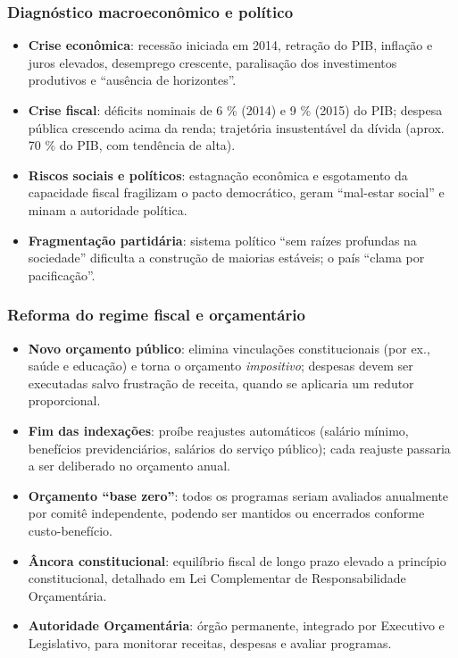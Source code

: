 \documentclass[a4paper,12pt]{article}[abntex2]
\begin{document}
\subsubsection{\textbf{Diagnóstico macroeconômico e político}}
\begin{itemize}
    \item \textbf{Crise econômica}: recessão iniciada em 2014, retração do PIB, inflação e juros elevados, desemprego crescente, paralisação dos investimentos produtivos e “ausência de horizontes”.  
    \item \textbf{Crise fiscal}: déficits nominais de 6 \% (2014) e 9 \% (2015) do PIB; despesa pública crescendo acima da renda; trajetória insustentável da dívida (aprox. 70 \% do PIB, com tendência de alta).  
    \item \textbf{Riscos sociais e políticos}: estagnação econômica e esgotamento da capacidade fiscal fragilizam o pacto democrático, geram “mal-estar social” e minam a autoridade política.  
    \item \textbf{Fragmentação partidária}: sistema político “sem raízes profundas na sociedade” dificulta a construção de maiorias estáveis; o país “clama por pacificação”.
\end{itemize}

\subsubsection{\textbf{Reforma do regime fiscal e orçamentário}}
\begin{itemize}
    \item \textbf{Novo orçamento público}: elimina vinculações constitucionais (por ex., saúde e educação) e torna o orçamento \emph{impositivo}; despesas devem ser executadas salvo frustração de receita, quando se aplicaria um redutor proporcional.  
    \item \textbf{Fim das indexações}: proíbe reajustes automáticos (salário mínimo, benefícios previdenciários, salários do serviço público); cada reajuste passaria a ser deliberado no orçamento anual.  
    \item \textbf{Orçamento “base zero”}: todos os programas seriam avaliados anualmente por comitê independente, podendo ser mantidos ou encerrados conforme custo-benefício.  
    \item \textbf{Âncora constitucional}: equilíbrio fiscal de longo prazo elevado a princípio constitucional, detalhado em Lei Complementar de Responsabilidade Orçamentária.  
    \item \textbf{Autoridade Orçamentária}: órgão permanente, integrado por Executivo e Legislativo, para monitorar receitas, despesas e avaliar programas.
\end{itemize}
\end{document}
